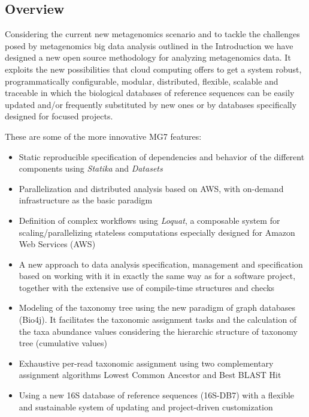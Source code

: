 \documentclass{frontiersSCNS} %
\providecommand{\tightlist}{%
\setlength{\itemsep}{0pt}\setlength{\parskip}{0pt}}
\begin{document}
\subsection{Overview}\label{overview}

Considering the current new metagenomics scenario and to tackle the
challenges posed by metagenomics big data analysis outlined in the
Introduction we have designed a new open source methodology for
analyzing metagenomics data. It exploits the new possibilities that
cloud computing offers to get a system robust, programmatically
configurable, modular, distributed, flexible, scalable and traceable in
which the biological databases of reference sequences can be easily
updated and/or frequently substituted by new ones or by databases
specifically designed for focused projects.

These are some of the more innovative MG7 features:

\begin{itemize}
\tightlist
\item
  Static reproducible specification of dependencies and behavior of the
  different components using \emph{Statika} and \emph{Datasets}
\item
  Parallelization and distributed analysis based on AWS, with on-demand
  infrastructure as the basic paradigm
\item
  Definition of complex workflows using \emph{Loquat}, a composable
  system for scaling/parallelizing stateless computations especially
  designed for Amazon Web Services (AWS)
\item
  A new approach to data analysis specification, management and
  specification based on working with it in exactly the same way as for
  a software project, together with the extensive use of compile-time
  structures and checks
\item
  Modeling of the taxonomy tree using the new paradigm of graph
  databases (Bio4j). It facilitates the taxonomic assignment tasks and
  the calculation of the taxa abundance values considering the
  hierarchic structure of taxonomy tree (cumulative values)
\item
  Exhaustive per-read taxonomic assignment using two complementary
  assignment algorithms Lowest Common Ancestor and Best BLAST Hit
\item
  Using a new 16S database of reference sequences (16S-DB7) with a
  flexible and sustainable system of updating and project-driven
  customization
\end{itemize}
\end{document}
